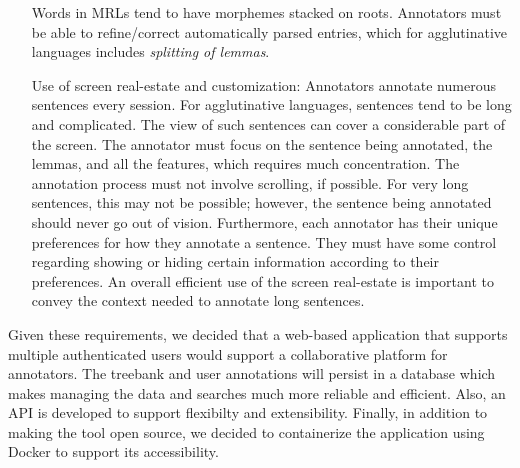\begin{itemize}[before=\normalfont, font=\itshape, align=left,noitemsep,topsep=0pt,parsep=0pt,partopsep=0pt,labelwidth=5cm,align=left,itemindent=5cm]
        Words in MRLs tend to have morphemes stacked on roots.
        Annotators must be able to refine/correct automatically parsed entries, which for agglutinative languages includes \textit{splitting of lemmas}.
    \item[Use of screen real-estate and customization:]
        Annotators annotate numerous sentences every session.
        For agglutinative languages, sentences tend to be long and complicated.
        The view of such sentences can cover a considerable part of the screen.
        The annotator must focus on the sentence being annotated, the lemmas, and all the features, which requires much concentration.
        The annotation process must not involve scrolling, if possible.
        For very long sentences, this may not be possible; however, the sentence being annotated should never go out of vision.
        Furthermore, each annotator has their unique preferences for how they annotate a sentence.
        They must have some control regarding showing or hiding certain information according to their preferences.
        An overall efficient use of the screen real-estate is important to convey the context needed to annotate long sentences.
\end{itemize}

Given these requirements, we decided that a web-based application that supports multiple authenticated users would support a collaborative platform for annotators.
The treebank and user annotations will persist in a database which makes managing the data and searches much more reliable and efficient.
Also, an API is developed to support flexibilty and extensibility.
Finally, in addition to making the tool open source, we decided to containerize the application using Docker\cite{docker} to support its accessibility.
